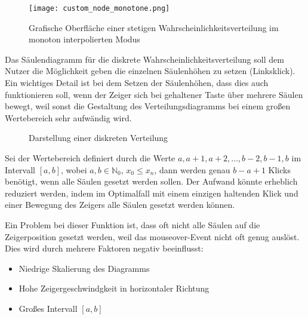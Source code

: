 \begin{figure}[H]
    \centering
    \texttt{[image: custom\_node\_monotone.png]}
    \caption{Grafische Oberfläche einer stetigen Wahrscheinlichkeitsverteilung im monoton interpolierten Modus}\label{fig:customnodemonotone}
\end{figure}

Das Säulendiagramm für die diskrete Wahrscheinlichkeitsverteilung soll dem Nutzer die Möglichkeit geben die einzelnen Säulenhöhen zu setzen (Linksklick). Ein wichtiges Detail ist bei dem Setzen der Säulenhöhen, dass dies auch funktionieren soll, wenn der Zeiger sich bei gehaltener Taste über mehrere Säulen bewegt, weil sonst die Gestaltung des Verteilungsdiagramms bei einem großen Wertebereich sehr aufwändig wird. 

\begin{figure}[H]
    \center
    \caption{Darstellung einer diskreten Verteilung}
\end{figure}

Sei der Wertebereich definiert durch die Werte $a,a+1,a+2,\dots,b-2,b-1,b$ im Intervall $[a,b]$, wobei $a,b \in\mathbb{N}_0$, $x_0 \le x_n$, dann werden genau $b-a+1$ Klicks benötigt, wenn alle Säulen gesetzt werden sollen. Der Aufwand könnte erheblich reduziert werden, indem im Optimalfall mit einem einzigen haltenden Klick und einer Bewegung des Zeigers alle Säulen gesetzt werden können.

Ein Problem bei dieser Funktion ist, dass oft nicht alle Säulen auf die Zeigerposition gesetzt werden, weil das mouseover-Event nicht oft genug auslöst. Dies wird durch mehrere Faktoren negativ beeinflusst:
\begin{itemize}
    \item Niedrige Skalierung des Diagramms
    \item Hohe Zeigergeschwindgkeit in horizontaler Richtung
    \item Großes Intervall $[a,b]$
 \end{itemize}

